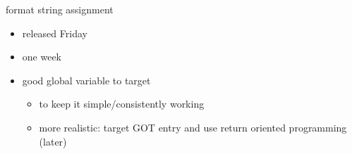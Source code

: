 \begin{frame}{format string assignment}
    \begin{itemize}
        \item released Friday
        \item one week
        \item good global variable to target
            \begin{itemize}
                \item to keep it simple/consistently working
                \item more realistic: target GOT entry and use return oriented programming (later)
            \end{itemize}
    \end{itemize}
\end{frame}
